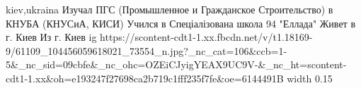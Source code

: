  
 
 
 
 

\par
kiev,ukraina
Изучал ПГС (Промышленное и Гражданское Строительство) в КНУБА (КНУСиА, КИСИ)
Учился в Спеціалізована школа 94 "Еллада"
Живет в г. Киев
Из г. Киев
\ifcmt
  ig https://scontent-cdt1-1.xx.fbcdn.net/v/t1.18169-9/61109_104456059618021_73554_n.jpg?_nc_cat=106&ccb=1-5&_nc_sid=09cbfe&_nc_ohc=OZEiCJyigYEAX9UC9V-&_nc_ht=scontent-cdt1-1.xx&oh=e193247f27698ca2b719c1fff235f7fe&oe=6144491B
  width 0.15
\fi

